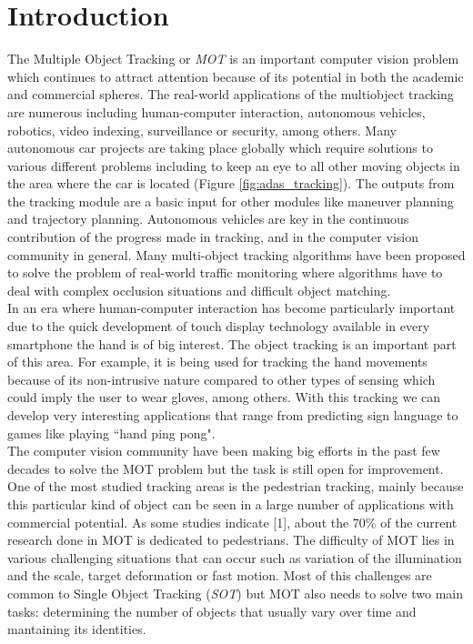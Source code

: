 \chapter{Introduction}\label{cap.introduccion}

\setlength{\parindent}{0pt}
The Multiple Object Tracking or \textit{MOT} is an important computer vision problem which continues to attract attention because of its potential in both the academic and commercial spheres. The real-world applications of the multiobject tracking are numerous including human-computer interaction, autonomous vehicles, robotics, video indexing, surveillance or security, among others. Many autonomous car projects are taking place globally which require solutions to various different problems including to keep an eye to all other moving objects in the area where the car is located (Figure \ref{fig:adas_tracking}). The outputs from the tracking module are a basic input for other modules like maneuver planning and trajectory planning. Autonomous vehicles are key in the continuous contribution of the progress made in tracking, and in the computer vision community in general. Many multi-object tracking algorithms have been proposed to solve the problem of real-world traffic monitoring where algorithms have to deal with complex occlusion situations and difficult object matching.\\
In an era where human-computer interaction has become particularly important due to the quick development of touch display technology available in every smartphone the hand is of big interest. The object tracking is an important part of this area. For example, it is being used for tracking the hand movements because of its non-intrusive nature compared to other types of sensing which could imply the user to wear gloves, among others. With this tracking we can develop very interesting applications that range from predicting sign language to games like playing ``hand ping pong".
\\
The computer vision community have been making big efforts in the past few decades to solve the MOT problem but the task is still open for improvement. One of the most studied tracking areas is the pedestrian tracking, mainly because this particular kind of object can be seen in a large number of applications with commercial potential. As some studies indicate [1], about the 70\% of the current research done in MOT is dedicated to pedestrians. The difficulty of MOT lies in various challenging situations that can occur such as variation of the illumination and the scale, target deformation or fast motion. Most of this challenges are common to Single Object Tracking (\textit{SOT}) but MOT also needs to solve two main tasks: determining the number of objects that usually vary over time and mantaining its identities.\\
